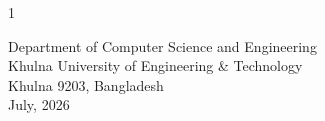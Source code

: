 \begin{spacing}{1}
\vfill
\begin{center}
{\tsizeTwelveHalf
Department of Computer Science and Engineering\\
Khulna University of Engineering \& Technology\\
Khulna 9203, Bangladesh\\
July, 2026\par}
\end{center}
\vspace*{0.32in}
\end{spacing}
\clearpage
